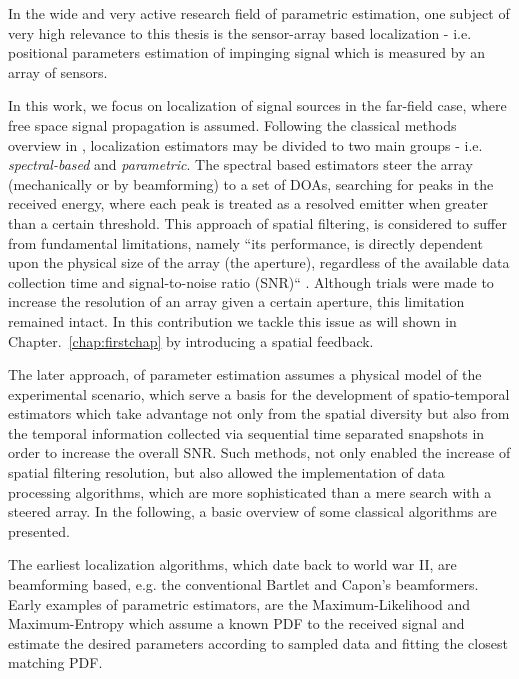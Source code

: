 In the wide and very active research field of parametric estimation, one subject of very high relevance to this thesis is the sensor-array based localization - i.e. positional parameters estimation of impinging signal which is measured by an array of sensors.
\par 
In this work, we focus on localization of signal sources in the far-field case, where free space signal propagation is assumed.
Following the classical methods overview in \cite{krim1996two}, localization estimators may be divided to two main groups - i.e. \textit{spectral-based} and \textit{parametric}.
The spectral based estimators steer the array (mechanically or by beamforming) to a set of DOAs, searching for peaks in the received energy, where each peak is treated as a resolved emitter when greater than a certain threshold.
This approach of spatial filtering, is considered to suffer from fundamental
limitations, namely ``its performance, is directly dependent upon the physical size of the array (the aperture), regardless of the available data collection time and signal-to-noise ratio (SNR)`` \cite{krim1996two}.
Although trials were made to increase the resolution of an array given a certain aperture, this limitation remained intact.
In this contribution we tackle this issue as will shown in Chapter.~\ref{chap:firstchap} by introducing a spatial feedback.
\par
The later approach, of parameter estimation assumes a physical model of the experimental scenario, which serve a basis for the development of spatio-temporal estimators which take advantage not only from the spatial diversity but also from the temporal information collected via sequential time separated snapshots in order to increase the overall SNR.
Such methods, not only enabled the increase of spatial filtering resolution, but also allowed the implementation of data processing algorithms, which are more sophisticated than a mere search with a steered array.
In the following, a basic overview of some classical algorithms are presented.
\par
The earliest localization algorithms, which date back to world war II, are beamforming based, e.g. the conventional Bartlet \cite{van2004optimum} and Capon's \cite{capon1969high} beamformers.
Early examples of parametric estimators, are the Maximum-Likelihood \cite{macdonald1969optimum,schweppe1968sensor} and Maximum-Entropy \cite{ables1974maximum} which assume a known PDF to the received signal and estimate the desired parameters according to sampled data and fitting the closest matching PDF.
